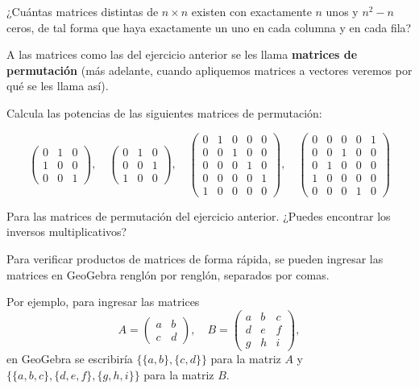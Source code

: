 \begin{ejercicio}
¿Cuántas matrices distintas de $n\times n$ existen con exactamente $n$ unos y $n^2-n$ ceros, de tal forma que haya exactamente un uno en cada columna y en cada fila?
\end{ejercicio}

A las matrices como las del ejercicio anterior se les llama {\bf matrices de permutación} (más adelante, cuando apliquemos matrices a vectores veremos por qué se les llama así).

\begin{ejercicio}
Calcula las potencias de las siguientes matrices de permutación:

$$\left(\begin{array}{ccc}
0&1&0 \\
1&0&0 \\
0&0&1
\end{array}\right)
,\quad 
\left(\begin{array}{ccc}
0&1&0 \\
0&0&1 \\
1&0&0  
\end{array}\right)
,\quad 
\left(\begin{array}{ccccc}
0 & 1 & 0 & 0 & 0 \\
0 & 0 & 1 & 0 & 0 \\
0 & 0 & 0 & 1 & 0 \\
0 & 0 & 0 &  0 & 1 \\
1 & 0 & 0 & 0 & 0
\end{array}\right)
,\quad 
\left(\begin{array}{ccccc}
0 & 0 & 0 & 0 & 1 \\
0 & 0 & 1 & 0 & 0 \\
0 & 1 & 0 & 0 & 0 \\
1 & 0 & 0 & 0 & 0 \\
0 & 0 & 0 & 1 & 0
\end{array}\right)
$$
\end{ejercicio}

\begin{ejercicio}
Para las matrices de permutación del ejercicio anterior. ¿Puedes encontrar los inversos multiplicativos?
\end{ejercicio}


Para verificar productos de matrices de forma rápida, se pueden ingresar las matrices en GeoGebra renglón por renglón, separados por comas.

Por ejemplo, para ingresar las matrices 
$$A=\left(\begin{array}{cc}
a& b \\
c& d 
\end{array}\right),
\quad 
B=\left(\begin{array}{ccc}
a& b& c \\
d& e& f \\
g& h& i  
\end{array}\right),$$
en GeoGebra se escribiría $\{\{a,b\},\{c,d\}\}$ para la matriz $A$ y  $\{\{a,b,c\},\{d,e,f\},\{g,h,i\}\}$ para la matriz $B$.

